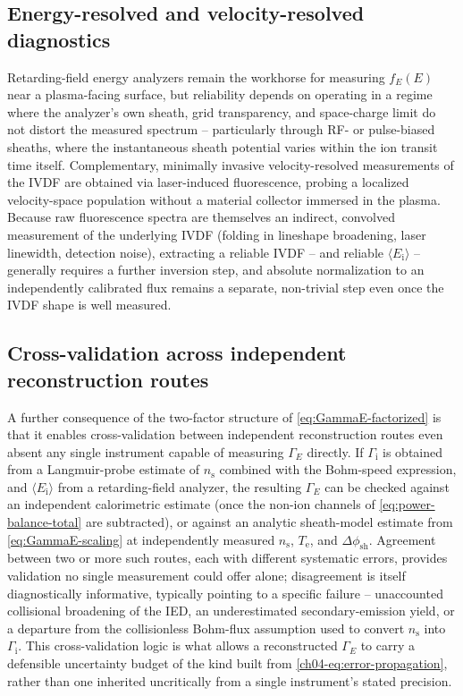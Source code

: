\subsection{Energy-resolved and velocity-resolved diagnostics}

Retarding-field energy analyzers remain the workhorse for measuring $f_E(E)$ near a plasma-facing surface, but reliability depends on operating in a regime where the analyzer's own sheath, grid transparency, and space-charge limit do not distort the measured spectrum -- particularly through RF- or pulse-biased sheaths, where the instantaneous sheath potential varies within the ion transit time itself. Complementary, minimally invasive velocity-resolved measurements of the IVDF are obtained via laser-induced fluorescence, probing a localized velocity-space population without a material collector immersed in the plasma. Because raw fluorescence spectra are themselves an indirect, convolved measurement of the underlying IVDF (folding in lineshape broadening, laser linewidth, detection noise), extracting a reliable IVDF -- and reliable $\langle E_{\mathrm{i}}\rangle$ -- generally requires a further inversion step, and absolute normalization to an independently calibrated flux remains a separate, non-trivial step even once the IVDF shape is well measured.

\subsection{Cross-validation across independent reconstruction routes}

A further consequence of the two-factor structure of \cref{eq:GammaE-factorized} is that it enables cross-validation between independent reconstruction routes even absent any single instrument capable of measuring $\Gamma_{E}$ directly. If $\Gamma_{\mathrm{i}}$ is obtained from a Langmuir-probe estimate of $n_{\mathrm{s}}$ combined with the Bohm-speed expression, and $\langle E_{\mathrm{i}}\rangle$ from a retarding-field analyzer, the resulting $\Gamma_{E}$ can be checked against an independent calorimetric estimate (once the non-ion channels of \cref{eq:power-balance-total} are subtracted), or against an analytic sheath-model estimate from \cref{eq:GammaE-scaling} at independently measured $n_{\mathrm{s}}$, $T_{\mathrm{e}}$, and $\Delta\phi_{\mathrm{sh}}$. Agreement between two or more such routes, each with different systematic errors, provides validation no single measurement could offer alone; disagreement is itself diagnostically informative, typically pointing to a specific failure -- unaccounted collisional broadening of the IED, an underestimated secondary-emission yield, or a departure from the collisionless Bohm-flux assumption used to convert $n_{\mathrm{s}}$ into $\Gamma_{\mathrm{i}}$. This cross-validation logic is what allows a reconstructed $\Gamma_{E}$ to carry a defensible uncertainty budget of the kind built from \cref{ch04-eq:error-propagation}, rather than one inherited uncritically from a single instrument's stated precision.

